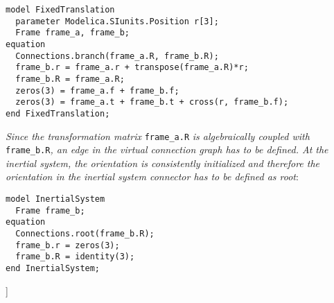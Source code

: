 \begin{lstlisting}[language=modelica]
model FixedTranslation
  parameter Modelica.SIunits.Position r[3];
  Frame frame_a, frame_b;
equation
  Connections.branch(frame_a.R, frame_b.R);
  frame_b.r = frame_a.r + transpose(frame_a.R)*r;
  frame_b.R = frame_a.R;
  zeros(3) = frame_a.f + frame_b.f;
  zeros(3) = frame_a.t + frame_b.t + cross(r, frame_b.f);
end FixedTranslation;
\end{lstlisting}
\emph{Since the transformation matrix} \lstinline!frame_a.R! \emph{is algebraically
coupled with} \lstinline!frame_b.R!\emph{, an edge in the virtual connection graph
has to be defined. At the inertial system, the orientation is
consistently initialized and therefore the orientation in the inertial
system connector has to be defined as root}:

\begin{lstlisting}[language=modelica]
model InertialSystem
  Frame frame_b;
equation
  Connections.root(frame_b.R);
  frame_b.r = zeros(3);
  frame_b.R = identity(3);
end InertialSystem;
\end{lstlisting}
{]}
